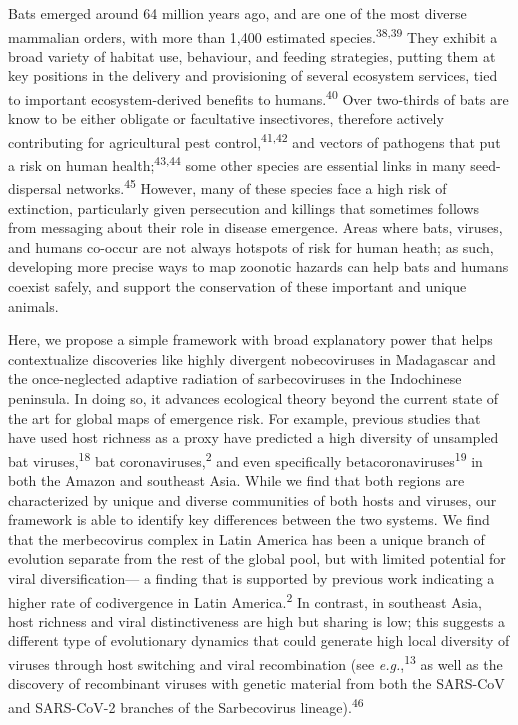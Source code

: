 \documentclass[11pt]{article}
\begin{document}
Bats emerged around 64 million years ago, and are one of the most
diverse mammalian orders, with more than 1,400 estimated
species.\textsuperscript{38,39} They exhibit a broad variety of habitat
use, behaviour, and feeding strategies, putting them at key positions in
the delivery and provisioning of several ecosystem services, tied to
important ecosystem-derived benefits to humans.\textsuperscript{40} Over
two-thirds of bats are know to be either obligate or facultative
insectivores, therefore actively contributing for agricultural pest
control,\textsuperscript{41,42} and vectors of pathogens that put a risk
on human health;\textsuperscript{43,44} some other species are essential
links in many seed-dispersal networks.\textsuperscript{45} However, many
of these species face a high risk of extinction, particularly given
persecution and killings that sometimes follows from messaging about
their role in disease emergence. Areas where bats, viruses, and humans
co-occur are not always hotspots of risk for human heath; as such,
developing more precise ways to map zoonotic hazards can help bats and
humans coexist safely, and support the conservation of these important
and unique animals.

Here, we propose a simple framework with broad explanatory power that
helps contextualize discoveries like highly divergent nobecoviruses in
Madagascar and the once-neglected adaptive radiation of sarbecoviruses
in the Indochinese peninsula. In doing so, it advances ecological theory
beyond the current state of the art for global maps of emergence risk.
For example, previous studies that have used host richness as a proxy
have predicted a high diversity of unsampled bat
viruses,\textsuperscript{18} bat coronaviruses,\textsuperscript{2} and
even specifically betacoronaviruses\textsuperscript{19} in both the
Amazon and southeast Asia. While we find that both regions are
characterized by unique and diverse communities of both hosts and
viruses, our framework is able to identify key differences between the
two systems. We find that the merbecovirus complex in Latin America has
been a unique branch of evolution separate from the rest of the global
pool, but with limited potential for viral diversification--- a finding
that is supported by previous work indicating a higher rate of
codivergence in Latin America.\textsuperscript{2} In contrast, in
southeast Asia, host richness and viral distinctiveness are high but
sharing is low; this suggests a different type of evolutionary dynamics
that could generate high local diversity of viruses through host
switching and viral recombination (see \emph{e.g.},\textsuperscript{13}
as well as the discovery of recombinant viruses with genetic material
from both the SARS-CoV and SARS-CoV-2 branches of the Sarbecovirus
lineage).\textsuperscript{46}
\end{document}
